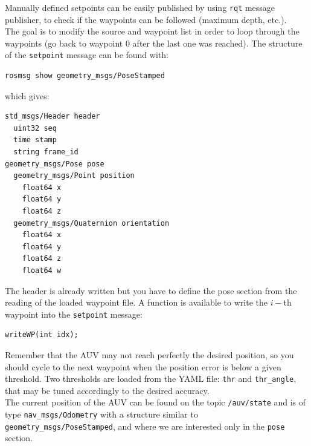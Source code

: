 \documentclass{ecnreport}
\begin{document}
Manually defined setpoints can be easily published by using \texttt{rqt} message publisher, to check if the waypoints can be followed (maximum depth, etc.).\\

The goal is to modify the source and waypoint list in order to loop through the waypoints (go back to waypoint 0 after the last one was reached).
The structure of the \texttt{setpoint} message can be found with:
\begin{center}
\begin{lstlisting}
rosmsg show geometry_msgs/PoseStamped
\end{lstlisting}
\end{center}
which gives:
\begin{center}
\begin{lstlisting}
std_msgs/Header header
  uint32 seq
  time stamp
  string frame_id
geometry_msgs/Pose pose
  geometry_msgs/Point position
    float64 x
    float64 y
    float64 z
  geometry_msgs/Quaternion orientation
    float64 x
    float64 y
    float64 z
    float64 w
\end{lstlisting}
\end{center}
The header is already written but you have to define the pose section from the reading of the loaded waypoint file.
A function is available to write the $i-$th waypoint into the \texttt{setpoint} message:
\begin{center}\cppstyle
\begin{lstlisting}
writeWP(int idx);
\end{lstlisting}
\end{center}
Remember that the AUV may not reach perfectly the desired position, so you should cycle to the next waypoint when the position error is below a given threshold.
Two thresholds are loaded from the YAML file: \texttt{thr} and \texttt{thr\_angle}, that may be tuned accordingly to the desired accuracy.\\
The current position of the AUV can be found on the topic \texttt{/auv/state} and is of type \texttt{nav\_msgs/Odometry} with a structure similar to \texttt{geometry\_msgs/PoseStamped}, and where we are interested only
in the \texttt{pose} section.\\


%
\end{document}

